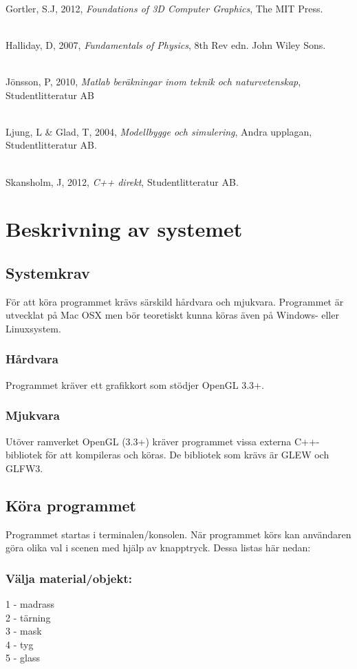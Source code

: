 \documentclass[a4paper,12pt,oneside,final,swedish]{extarticle}
\begin{document}
\noindent \\Gortler, S.J, 2012, \textit{Foundations of 3D Computer Graphics}, The MIT Press.

\noindent \\Halliday, D, 2007, \textit{Fundamentals of Physics}, 8th Rev edn. John Wiley Sons.

\noindent \\Jönsson, P, 2010, \textit{Matlab beräkningar inom teknik och naturvetenskap}, Studentlitteratur AB

\noindent \\Ljung, L \& Glad, T, 2004, \textit{Modellbygge och simulering}, Andra upplagan, Studentlitteratur AB.

\noindent \\Skansholm, J, 2012, \textit{C++ direkt}, Studentlitteratur AB.



\pagebreak
\appendix

\section{Beskrivning av systemet}
\subsection{Systemkrav}
För att köra programmet krävs särskild hårdvara och mjukvara. Programmet är utvecklat på Mac OSX men bör teoretiskt kunna köras även på Windows- eller Linuxsystem.
\subsubsection{Hårdvara}
Programmet kräver ett grafikkort som stödjer OpenGL 3.3+.
\subsubsection{Mjukvara}
Utöver ramverket OpenGL (3.3+) kräver programmet vissa externa C++-bibliotek för att kompileras och köras. De bibliotek som krävs är GLEW och GLFW3.
\subsection{Köra programmet}
Programmet startas i terminalen/konsolen. När programmet körs kan användaren göra olika val i scenen med hjälp av knapptryck. Dessa listas här nedan:
\subsubsection{Välja material/objekt:}
1 - madrass
\\2 - tärning
\\3 - mask
\\4 - tyg
\\5 - glass
\end{document}
